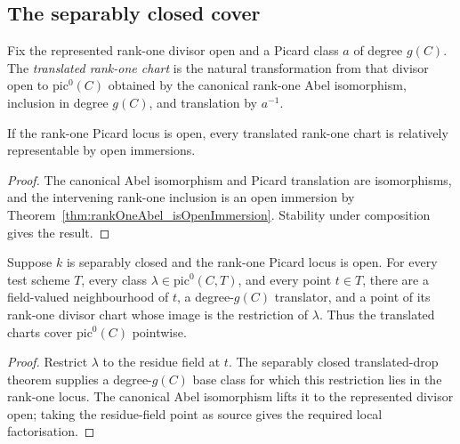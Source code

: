 \subsection{The separably closed cover}

\begin{definition}
  \label{def:pic0TranslatedRankOneOpen}
  \leanok
  Fix the represented rank-one divisor open and a Picard class \(a\) of degree \(g(C)\).
  The \emph{translated rank-one chart} is the natural transformation from that divisor open
  to \(\mathrm{pic}^0(C)\) obtained by the canonical rank-one Abel isomorphism, inclusion in
  degree \(g(C)\), and translation by \(a^{-1}\).
\end{definition}

\begin{theorem}
  \label{thm:pic0TranslatedRankOneOpen_representable}
  \leanok
  If the rank-one Picard locus is open, every translated rank-one chart is relatively
  representable by open immersions.
\end{theorem}
\begin{proof}
  \leanok
  The canonical Abel isomorphism and Picard translation are isomorphisms, and the intervening
  rank-one inclusion is an open immersion by
  Theorem~\ref{thm:rankOneAbel_isOpenImmersion}.  Stability under composition gives the
  result.
\end{proof}

\begin{theorem}
  \label{thm:rankOne_translate_cover_sepClosed}
  \leanok
  Suppose \(k\) is separably closed and the rank-one Picard locus is open.  For every test
  scheme \(T\), every class \(\lambda\in\mathrm{pic}^0(C,T)\), and every point \(t\in T\),
  there are a field-valued neighbourhood of \(t\), a degree-\(g(C)\) translator, and a point
  of its rank-one divisor chart whose image is the restriction of \(\lambda\).  Thus the
  translated charts cover \(\mathrm{pic}^0(C)\) pointwise.
\end{theorem}
\begin{proof}
  \leanok
  Restrict \(\lambda\) to the residue field at \(t\).  The separably closed translated-drop
  theorem supplies a degree-\(g(C)\) base class for which this restriction lies in the
  rank-one locus.  The canonical Abel isomorphism lifts it to the represented divisor open;
  taking the residue-field point as source gives the required local factorisation.
\end{proof}

